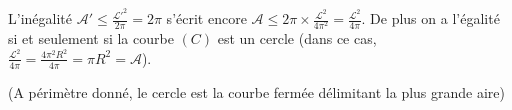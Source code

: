 {{L'inégalité $\mathcal{A}'\leqslant \frac{\mathcal{L}'^2}{2\pi}=2\pi$ s'écrit encore $\mathcal{A}\leqslant2\pi\times \frac{\mathcal{L}^2}{4\pi^2}= \frac{\mathcal{L}^2}{4\pi}$. De plus on a l'égalité si et seulement si la courbe $(C)$ est un cercle (dans ce cas, $ \frac{\mathcal{L}^2}{4\pi}= \frac{4\pi^2R^2}{4\pi}=\pi R^2=\mathcal{A}$).

\begin{center}
\end{center}

(A périmètre donné, le cercle est la courbe fermée délimitant la plus grande aire)
}
}
